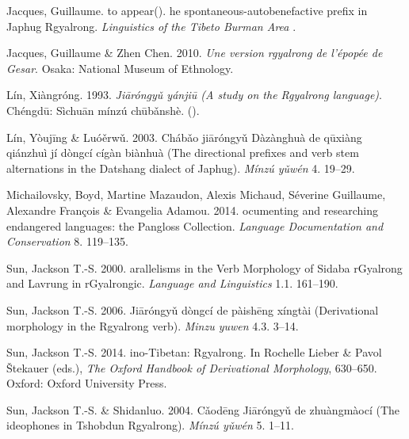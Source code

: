 \begin{thebibliography}{17}
Jacques, Guillaume. to appear{()}.
he spontaneous-autobenefactive prefix in {J}aphug {R}gyalrong.
\newblock \emph{Linguistics of the Tibeto Burman Area} .

Jacques, Guillaume \& Zhen Chen. 2010.
\newblock \emph{{U}ne version rgyalrong de l'épopée de {G}esar}.
\newblock Osaka: National Museum of Ethnology.

Lín, Xiàngróng. 1993.
\newblock \emph{ {J}iāróngy\v{u} yánjiū ({A} study on
  the {R}gyalrong language)}.
\newblock {} Chéngdū: Sìchuān mínzú
  chūb\v{a}nshè.
\newblock ().

Lín, Yòujīng \& Luó\v{e}rw\v{u}. 2003.
\newblock {}
  {C}hábǎo jiāróngyǔ {D}àzànghuà de qūxiàng qiánzhuì
  jí dòngcí cígàn biànhuà ({T}he directional prefixes and verb
  stem alternations in the {D}atshang dialect of {J}aphug).
\newblock \emph{ Mínzú y\v{u}wén} 4. 19--29.

Michailovsky, Boyd, Martine Mazaudon, Alexis Michaud, Séverine Guillaume,
  Alexandre François \& Evangelia Adamou. 2014.
ocumenting and researching endangered languages: the {P}angloss
  {C}ollection.
\newblock \emph{Language Documentation and Conservation} 8. 119–135.

Sun, Jackson T.-S. 2000.
arallelisms in the {V}erb {M}orphology of {S}idaba r{G}yalrong and
  {L}avrung in r{G}yalrongic.
\newblock \emph{Language and Linguistics} 1.1. 161--190.

Sun, Jackson T.-S. 2006.
\newblock {} {J}iāróngyǔ dòngcí de
  pàishēng xíngtài ({D}erivational morphology in the {R}gyalrong verb).
\newblock \emph{Minzu yuwen } 4.3. 3--14.

Sun, Jackson T.-S. 2014.
ino-{T}ibetan: {R}gyalrong.
\newblock In Rochelle Lieber \& Pavol Štekauer (eds.), \emph{{T}he {O}xford
  {H}andbook of {D}erivational {M}orphology}, 630--650. Oxford: Oxford
  University Press.

Sun, Jackson T.-S. \& Shidanluo. 2004.
\newblock {} {C}ǎodēng {J}iāróngyǔ de
  zhuàngmàocí ({T}he ideophones in {T}shobdun {R}gyalrong).
\newblock \emph{Mínzú y\v{u}wén } 5. 1--11.

\end{thebibliography}

\cleardoublepage
{}
\setmainfont[Mapping=tex-text,Numbers=OldStyle,Ligatures=Common]{Charis SIL} 